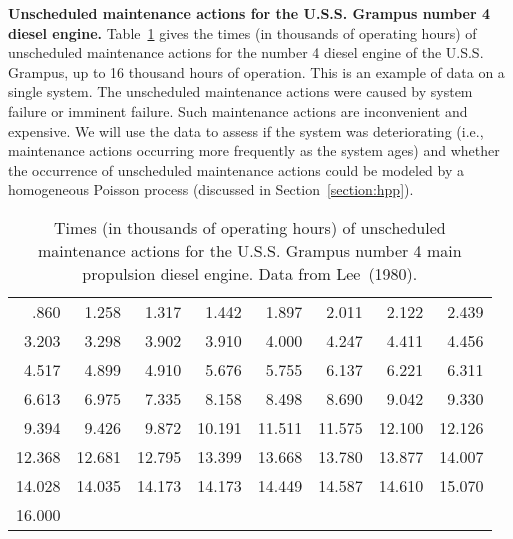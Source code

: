 \begin{example}
\label{example:grampus.data}
{\bf Unscheduled maintenance actions for the U.S.S. Grampus
number 4 diesel engine.} Table~\ref{table:grampus}
gives the times (in thousands of operating hours) of unscheduled
maintenance actions for the number 4 diesel engine of
the U.S.S. Grampus, up to 16 thousand hours of operation.  This is an
example of data on a single system. The unscheduled maintenance
actions were caused by system failure or imminent failure. Such
maintenance actions are inconvenient and expensive. We will use the data
to assess if the system was deteriorating (i.e., maintenance actions
occurring more frequently as the system ages) and whether the
occurrence of unscheduled maintenance actions could be modeled by a
homogeneous Poisson process (discussed in Section~\ref{section:hpp}).
\begin{table}
\caption{Times (in thousands of operating hours) 
of unscheduled maintenance actions for the U.S.S. Grampus
number 4 main propulsion diesel engine. Data from Lee~(1980).}
\centering\small
\begin{tabular}{*{8}{r}}
\\[-.5ex]
\hline
   .860 &  1.258 &  1.317 &  1.442 & 1.897 &  2.011 & 2.122 &  2.439  \\
  3.203 &  3.298 &  3.902 &  3.910 &  4.000 &  4.247 &  4.411 &  4.456   \\
  4.517 &  4.899 &  4.910 &  5.676 &  5.755 &  6.137 &  6.221 &  6.311   \\
  6.613 &  6.975 &  7.335 &  8.158 &  8.498 &  8.690 &  9.042 &  9.330   \\
  9.394 &  9.426 &  9.872 & 10.191 & 11.511 & 11.575 & 12.100 & 12.126   \\
 12.368 & 12.681 & 12.795 & 13.399 & 13.668 & 13.780 & 13.877 & 14.007   \\
 14.028 & 14.035 & 14.173 & 14.173 & 14.449 & 14.587 & 14.610 & 15.070   \\
 16.000   \\
\hline      
\end{tabular}
\label{table:grampus}
\end{table}
\end{example}

